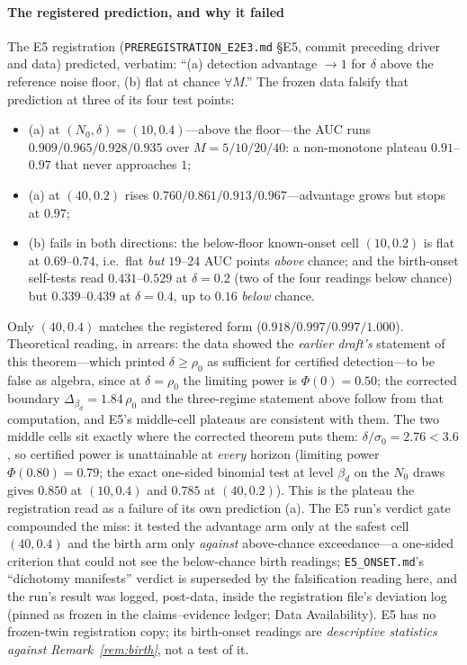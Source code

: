 \paragraph{The registered prediction, and why it failed}
The E5 registration (\texttt{PREREGISTRATION\_E2E3.md} \S E5, commit
preceding driver and data) predicted, verbatim: ``(a) detection advantage
$\to1$ for $\delta$ above the reference noise floor, (b) flat at chance
$\forall M$.'' The frozen data falsify that prediction at three of its
four test points:
\begin{itemize}[leftmargin=1.6em,itemsep=1pt,topsep=2pt]
\item (a) at $(N_0,\delta)=(10,0.4)$---above the floor---the AUC runs
$0.909/0.965/0.928/0.935$ over $M=5/10/20/40$: a non-monotone plateau
$0.91$--$0.97$ that never approaches $1$;
\item (a) at $(40,0.2)$ rises $0.760/0.861/0.913/0.967$---advantage grows
but stops at $0.97$;
\item (b) fails in both directions: the below-floor known-onset cell
$(10,0.2)$ is flat at $0.69$--$0.74$, i.e.\ flat \emph{but} $19$--$24$
AUC points \emph{above} chance; and the birth-onset self-tests read
$0.431$--$0.529$ at $\delta=0.2$ (two of the four readings below chance)
but $0.339$--$0.439$ at $\delta=0.4$, up to $0.16$ \emph{below} chance.
\end{itemize}
Only $(40,0.4)$ matches the registered form
($0.918/0.997/0.997/1.000$). Theoretical reading, in arrears: the data
showed the \emph{earlier draft's} statement of this theorem---which
printed $\delta\ge\rho_0$ as sufficient for certified detection---to be
false as algebra, since at $\delta=\rho_0$ the limiting power is
$\Phi(0)=0.50$; the corrected boundary $\Delta_{\beta_d}=1.84\,\rho_0$ and
the three-regime statement above follow from that computation, and E5's
middle-cell plateaus are consistent with them. The two middle cells sit exactly where the
corrected theorem puts them: $\delta/\sigma_0=2.76<3.6$, so certified
power is unattainable at \emph{every} horizon (limiting power
$\Phi(0.80)=0.79$; the exact one-sided binomial test at level $\beta_d$ on
the $N_0$ draws gives $0.850$ at $(10,0.4)$ and $0.785$ at $(40,0.2)$). This is the plateau the
registration read as a failure of its own prediction (a). The E5 run's
verdict gate compounded the miss: it tested the advantage arm only at the
safest cell $(40,0.4)$ and the birth arm only \emph{against}
above-chance exceedance---a one-sided criterion that could not see the
below-chance birth readings; \texttt{E5\_ONSET.md}'s ``dichotomy
manifests'' verdict is superseded by the falsification reading here, and
the run's result was logged, post-data, inside the registration file's
deviation log (pinned as frozen in the claims--evidence ledger; Data
Availability). E5 has no frozen-twin registration copy; its birth-onset
readings are \emph{descriptive statistics against
Remark~\ref{rem:birth}}, not a test of it.

